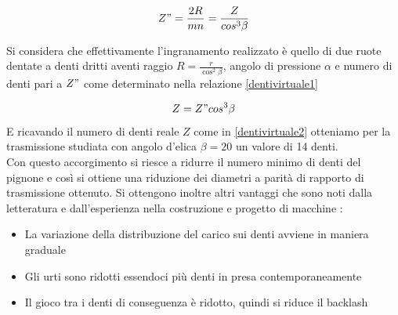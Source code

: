 \documentclass[%
corpo=11pt,
twoside,
 stile=classica,
oldstyle,
greek,%
]{toptesi}
\begin{document}
	\begin{equation}\label{dentivirtuale1}
	Z"=\frac{2R}{mn}=\frac{Z}{cos^3\beta}
	\end{equation}  
	
	Si considera che effettivamente l'ingranamento realizzato è quello di due ruote dentate a denti dritti aventi raggio $R=\frac{r}{\cos^2\beta}$, angolo di pressione $\alpha$ e numero di denti pari a $Z"$ come determinato nella relazione \ref{dentivirtuale1}
	
	\begin{equation}\label{dentivirtuale2}
	Z=Z" cos^3\beta
	\end{equation} 
	E ricavando il numero di denti reale $Z$ come in \ref{dentivirtuale2} otteniamo per la trasmissione studiata con angolo d'elica $\beta=20$ un valore di 14 denti. \\
	Con questo accorgimento si riesce a ridurre il numero minimo di denti del pignone e così si ottiene una riduzione dei diametri a parità di rapporto di trasmissione ottenuto. Si ottengono inoltre altri vantaggi che sono noti dalla letteratura e dall'esperienza nella costruzione e progetto di macchine :
	\begin{itemize}
		\item La variazione della distribuzione del carico sui denti avviene in maniera graduale 
		\item Gli urti sono ridotti essendoci più denti in presa contemporaneamente
		\item Il gioco tra i denti di conseguenza è ridotto, quindi si riduce il backlash
	\end{itemize}
\end{document}
